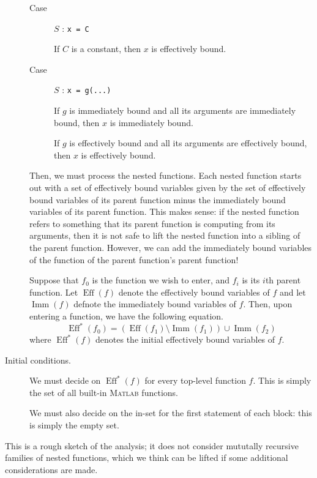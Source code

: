 \documentclass[letterpaper,11pt]{article}
\newcommand{\matlab}{\textsc{Matlab}}
\DeclareMathOperator{\immOp}{Imm}
\DeclareMathOperator{\effOp}{Eff}
\newcommand{\imm}[1]{\immOp{\left(#1\right)}}
\newcommand{\eff}[1]{\effOp{\left(#1\right)}}
\begin{document}
\begin{description}
\begin{description}
            \item[Case] $S$ : \texttt{x = C}

                If $C$ is a constant, then $x$ is effectively bound.

            \item[Case] $S$ : \texttt{x = g(...)}

                If $g$ is immediately bound and all its arguments are
                immediately bound, then $x$ is immediately bound.

                If $g$ is effectively bound and all its arguments are
                effectively bound, then $x$ is effectively bound.
        \end{description}

        Then, we must process the nested functions. Each nested function starts
        out with a set of effectively bound variables given by the set of
        effectively bound variables of its parent function minus the
        immediately bound variables of its parent function. This makes sense:
        if the nested function refers to something that its parent function is
        computing from its arguments, then it is not safe to lift the nested
        function into a sibling of the parent function. However, we can add the
        immediately bound variables of the function of the parent function's
        parent function!

        Suppose that $f_0$ is the function we wish to enter, and $f_i$ is its
        $i$th parent function. Let $\eff{f}$ denote the effectively bound
        variables of $f$ and let $\imm{f}$ defnote the immediately bound
        variables of $f$. Then, upon entering a function, we have the following
        equation.
        \begin{equation*}
            \effOp^*{(f_0)} = (\eff{f_1} \setminus \imm{f_1}) \cup \imm{f_2}
        \end{equation*}
        where $\effOp^*{(f)}$ denotes the initial effectively bound variables
        of $f$.

    \item[Initial conditions.]
        We must decide on $\effOp^*{(f)}$ for every top-level function $f$.
        This is simply the set of all built-in \matlab{} functions.

        We must also decide on the in-set for the first statement of each
        block: this is simply the empty set.
\end{description}

This is a rough sketch of the analysis; it does not consider mututally
recursive families of nested functions, which we think can be lifted if some
additional considerations are made.
\end{document}
